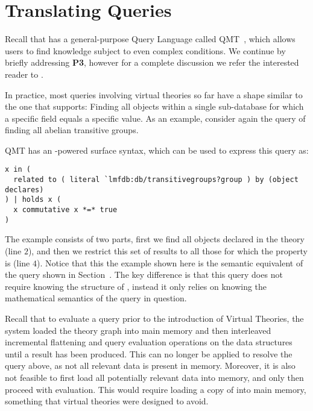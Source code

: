 \section{Translating Queries}\label{sec:qmt}

Recall that \mmt has a general-purpose Query Language called QMT~\cite{Rabe:qlfml12}, which allows users to find knowledge subject to even complex conditions. 
We continue by briefly addressing \textbf{P3}, however for a complete discussion we refer the interested reader to \cite{twiesing:msc17}. 

In practice, most queries involving virtual theories so far have a shape similar to the one that \lmfdb supports: 
Finding all objects within a single sub-database for which a specific field equals a specific value. 
As an example, consider again the query of finding all abelian transitive groups. 
 
QMT has an \mmt-powered surface syntax, which can be used to express this query as:
\begin{lstlisting}[language=qmt]
x in (
  related to ( literal `lmfdb:db/transitivegroups?group ) by (object declares)
) | holds x (
  x commutative x *=* true
)
\end{lstlisting}

The example consists of two parts, first we find all objects declared in the  theory (line $2$), and then we restrict this set of results to all those for which the  property is  (line $4$). 
Notice that this the example shown here is the semantic equivalent of the \lmfdb query shown in Section~\label{sec:sota:api}. 
The key difference is that this query does not require knowing the structure of \lmfdb, instead it only relies on knowing the mathematical semantics of the query in question. 

Recall that to evaluate a query prior to the introduction of Virtual Theories, the \mmt system loaded the theory graph into main memory and then interleaved incremental flattening and query evaluation operations on the \mmt data structures until a result has been produced. 
This can no longer be applied to resolve the query above, as not all relevant data is present in memory. 
Moreover, it is also not feasible to first load all potentially relevant data into memory, and only then proceed with evaluation. 
This would require loading a copy of \lmfdb into main memory, something that virtual theories were designed to avoid. 

